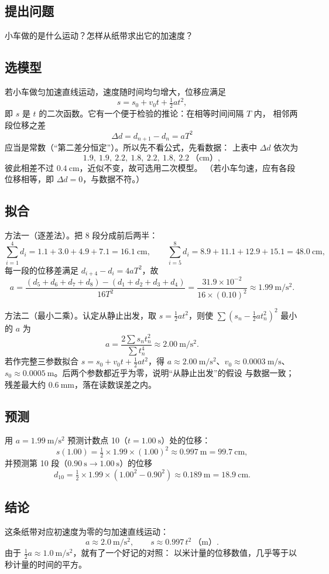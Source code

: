 \subsection{提出问题}
小车做的是什么运动？怎样从纸带求出它的加速度？

\subsection{选模型}
若小车做匀加速直线运动，速度随时间均匀增大，位移应满足
\[
  s=s_0+v_0t+\tfrac12at^2,
\]
即 $s$ 是 $t$ 的二次函数。它有一个便于检验的推论：在相等时间间隔 $T$ 内，
相邻两段位移之差
\[
  \Delta d=d_{n+1}-d_n=aT^2
\]
应当是常数（“第二差分恒定”）。所以先不看公式，先看数据：
上表中 $\Delta d$ 依次为
\[
  1.9,\ 1.9,\ 2.2,\ 1.8,\ 2.2,\ 1.8,\ 2.2\ \text{（cm）},
\]
彼此相差不过 $0.4\ \mathrm{cm}$，近似不变，故可选用二次模型。
（若小车匀速，应有各段位移相等，即 $\Delta d=0$，与数据不符。）

\subsection{拟合}
方法一（逐差法）。把 8 段分成前后两半：
\[
  \sum_{i=1}^{4}d_i=1.1+3.0+4.9+7.1=16.1\ \mathrm{cm},\qquad
  \sum_{i=5}^{8}d_i=8.9+11.1+12.9+15.1=48.0\ \mathrm{cm},
\]
每一段的位移差满足 $d_{i+4}-d_i=4aT^2$，故
\[
  a=\frac{(d_5+d_6+d_7+d_8)-(d_1+d_2+d_3+d_4)}{16T^2}
  =\frac{31.9\times10^{-2}}{16\times(0.10)^2}
  \approx1.99\ \mathrm{m/s^2}.
\]

方法二（最小二乘）。认定从静止出发，取 $s=\tfrac12at^2$，则使
$\sum\left(s_n-\tfrac12at_n^2\right)^2$ 最小的 $a$ 为
\[
  a=\frac{2\sum s_nt_n^2}{\sum t_n^4}\approx2.00\ \mathrm{m/s^2}.
\]
若作完整三参数拟合 $s=s_0+v_0t+\tfrac12at^2$，得
$a\approx2.00\ \mathrm{m/s^2}$、$v_0\approx0.0003\ \mathrm{m/s}$、
$s_0\approx0.0005\ \mathrm{m}$。后两个参数都近乎为零，说明“从静止出发”的假设
与数据一致；残差最大约 $0.6\ \mathrm{mm}$，落在读数误差之内。

\subsection{预测}
用 $a=1.99\ \mathrm{m/s^2}$ 预测计数点 10（$t=1.00\ \mathrm{s}$）处的位移：
\[
  s(1.00)=\tfrac12\times1.99\times(1.00)^2\approx0.997\ \mathrm{m}=99.7\ \mathrm{cm},
\]
并预测第 10 段（$0.90\ \mathrm{s}\to1.00\ \mathrm{s}$）的位移
\[
  d_{10}=\tfrac12\times1.99\times(1.00^2-0.90^2)\approx0.189\ \mathrm{m}=18.9\ \mathrm{cm}.
\]

\subsection{结论}
这条纸带对应初速度为零的匀加速直线运动：
\[
  a\approx2.0\ \mathrm{m/s^2},\qquad s\approx0.997\,t^2\ \text{（m）}.
\]
由于 $\tfrac12a\approx1.0\ \mathrm{m/s^2}$，就有了一个好记的对照：
以米计量的位移数值，几乎等于以秒计量的时间的平方。

